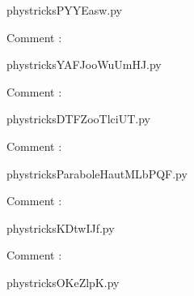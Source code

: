    \newcommand{\CaptionFigPYYEasw}{<+Type your caption here+>}
    \begin{center}
        
    \end{center}
    phystricksPYYEasw.py

    Comment : 

    \clearpage
    


    \newcommand{\CaptionFigYAFJooWuUmHJ}{<+Type your caption here+>}
    \begin{center}
        
    \end{center}
    phystricksYAFJooWuUmHJ.py

    Comment : 

    \clearpage
    


    \newcommand{\CaptionFigDTFZooTlciUT}{<+Type your caption here+>}
    \begin{center}
        
    \end{center}
    phystricksDTFZooTlciUT.py

    Comment : 

    \clearpage
    


    \newcommand{\CaptionFigParaboleHautMLbPQF}{<+Type your caption here+>}
    \begin{center}
        
    \end{center}
    phystricksParaboleHautMLbPQF.py

    Comment : 

    \clearpage
    


    \newcommand{\CaptionFigKDtwIJf}{<+Type your caption here+>}
    \begin{center}
        
    \end{center}
    phystricksKDtwIJf.py

    Comment : 

    \clearpage
    


    \newcommand{\CaptionFigOKeZlpK}{<+Type your caption here+>}
    \begin{center}
        
    \end{center}
    phystricksOKeZlpK.py


